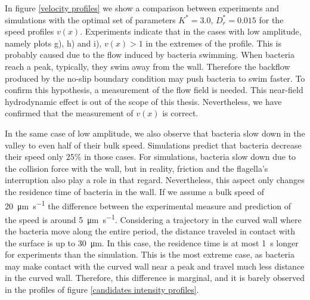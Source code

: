 
In figure \ref{velocity profiles} we show a comparison between experiments and simulations with the optimal set of parameters $K^*=3.0$, $D_r^*=0.015$ for the speed profiles $v(x)$. Experiments indicate that in the cases with low amplitude, namely plots g), h) and i), $v(x)>1$ in the extremes of the profile. This is probably caused due to the flow induced by bacteria swimming. When bacteria reach a peak, typically, they swim away from the wall. Therefore the backflow produced by the no-slip boundary condition may push bacteria to swim faster. To confirm this hypothesis, a measurement of the flow field is needed. This near-field hydrodynamic effect is out of the scope of this thesis. Nevertheless, we have confirmed that the measurement of $v(x)$ is correct.

In the same case of low amplitude, we also observe that bacteria slow down in the valley to even half of their bulk speed. Simulations predict that bacteria decrease their speed only $25\%$ in those cases. For simulations, bacteria slow down due to the collision force with the wall, but in reality, friction and the flagella's interruption also play a role in that regard. Nevertheless, this aspect only changes the residence time of bacteria in the wall. If we assume a bulk speed of \SI[per-mode = symbol]{20}{\micro\meter\per\second} the difference between the experimental measure and prediction of the speed is around \SI[per-mode = symbol]{5}{\micro\meter\per\second}. Considering a trajectory in the curved wall where the bacteria move along the entire period, the distance traveled in contact with the surface is up to \SI{30}{\micro\meter}. In this case, the residence time is at most \SI{1}{\second} longer for experiments than the simulation. This is the most extreme case, as bacteria may make contact with the curved wall near a peak and travel much less distance in the curved wall. Therefore, this difference is marginal, and it is barely observed in the profiles of figure \ref{candidates intensity profiles}.


